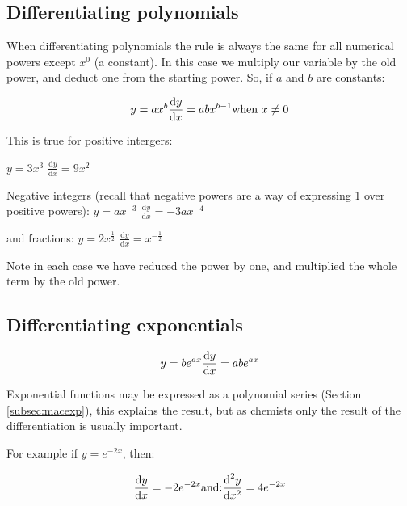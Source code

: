 \documentclass[
]{book}
\begin{document}
\hypertarget{subsec:diffpolynomial}{%
\subsection{Differentiating polynomials}\label{subsec:diffpolynomial}}

When differentiating polynomials the rule is always the same for all numerical powers except \(x^0\) (a constant). In this case we multiply our variable by the old power, and deduct one from the starting power. So, if \(a\) and \(b\) are constants:

\begin{equation}
y = ax^b\\
\frac{\textrm{d}y}{\textrm{d}x}=abx^{b-1}\\
\textrm{when } x \neq 0
\label{eq:diffpoly}
\end{equation}

This is true for positive intergers:

\(y = 3x^3\) \(\frac{\textrm{d}y}{\textrm{d}x} = 9x^2\)

Negative integers (recall that negative powers are a way of expressing 1 over positive powers):
\(y = ax^{-3}\) \(\frac{\textrm{d}y}{\textrm{d}x} = -3ax^{-4}\)

and fractions:
\(y = 2x^{\frac{1}{2}}\) \(\frac{\textrm{d}y}{\textrm{d}x} = x^{-\frac{1}{2}}\)

Note in each case we have reduced the power by one, and multiplied the whole term by the old power.

\hypertarget{subsec:diffexp}{%
\subsection{Differentiating exponentials}\label{subsec:diffexp}}

\begin{equation}
y = be^{ax}\\
\frac{\textrm{d}y}{\textrm{d}x}=abe^{ax}
\label{eq:diffexp}
\end{equation}

Exponential functions may be expressed as a polynomial series (Section \ref{subsec:macexp}), this explains the result, but as chemists only the result of the differentiation is usually important.

For example if \(y=e^{-2x}\), then:

\begin{equation*}
\frac{\textrm{d}y}{\textrm{d}x}=-2e^{-2x}\\
\textrm{and:}\\
\frac{\textrm{d}^2y}{\textrm{d}x^2}=4e^{-2x}
\end{equation*}
\end{document}
